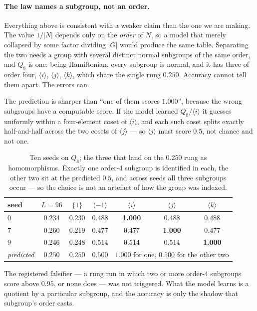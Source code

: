 \documentclass[10pt]{article}
\begin{document}
\paragraph{The law names a subgroup, not an order.} Everything above is consistent with a weaker
claim than the one we are making. The value $1/|N|$ depends only on the \emph{order} of $N$, so a
model that merely collapsed by some factor dividing $|G|$ would produce the same table. Separating
the two needs a group with several distinct normal subgroups of the same order, and $Q_8$ is one:
being Hamiltonian, every subgroup is normal, and it has three of order four,
$\langle i\rangle$, $\langle j\rangle$, $\langle k\rangle$, which share the single rung $0.250$.
Accuracy cannot tell them apart. The errors can.

The prediction is sharper than ``one of them scores $1.000$'', because the wrong subgroups have a
computable score. If the model learned $Q_8/\langle i\rangle$ it guesses uniformly within a
four-element coset of $\langle i\rangle$, and each such coset splits exactly half-and-half across the
two cosets of $\langle j\rangle$ --- so $\langle j\rangle$ must score $0.5$, not chance and not one.

\begin{table}[H]\centering\small
\caption{Ten seeds on $Q_8$; the three that land on the $0.250$ rung as homomorphisms. Exactly one
order-4 subgroup is identified in each, the other two sit at the predicted $0.5$, and across seeds
all three subgroups occur --- so the choice is not an artefact of how the group was indexed.}
\begin{tabular}{lcccccc}
\toprule
seed & $L=96$ & $\{1\}$ & $\langle -1\rangle$ & $\langle i\rangle$ & $\langle j\rangle$ & $\langle k\rangle$ \\
\midrule
0 & 0.234 & 0.230 & 0.488 & \textbf{1.000} & 0.488 & 0.488 \\
7 & 0.260 & 0.219 & 0.477 & 0.477 & \textbf{1.000} & 0.477 \\
9 & 0.246 & 0.248 & 0.514 & 0.514 & 0.514 & \textbf{1.000} \\
\midrule
\textit{predicted} & $0.250$ & $0.250$ & $0.500$ & \multicolumn{3}{c}{$1.000$ for one, $0.500$ for the other two} \\
\bottomrule
\end{tabular}
\label{tab:whichsub}
\end{table}

The registered falsifier --- a rung run in which two or more order-4 subgroups score above $0.95$,
or none does --- was not triggered. What the model learns is a quotient by a particular subgroup,
and the accuracy is only the shadow that subgroup's order casts.
\end{document}
